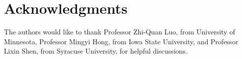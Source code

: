 \documentclass[journal]{IEEEtran}
\begin{document}
\section*{Acknowledgments}
The authors would like to thank Professor Zhi-Quan Luo, from University of Minnesota, Professor Mingyi Hong, from Iowa State University, and Professor Lixin Shen, from Syracuse University, for helpful discussions.




\end{document}

